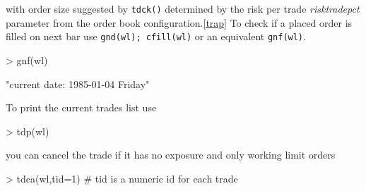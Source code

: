 \documentclass{article}
\begin{document}
with order size suggested by {\tt tdck()} determined by the risk per trade {\sl risktradepct} parameter
from the order book configuration.\ref{trap} 
To check if a placed order is filled on next bar use {\tt gnd(wl); cfill(wl)} or  an equivalent {\tt gnf(wl)}.
\begin{Schunk}
\begin{Sinput}
> gnf(wl)
\end{Sinput}
\begin{Soutput}
[1] "current date: 1985-01-04 Friday"
\end{Soutput}
\end{Schunk}
To print the current trades list use
\begin{Schunk}
\begin{Sinput}
> tdp(wl)
\end{Sinput}
\end{Schunk}
you can cancel the trade if it has no exposure and only working limit orders
\begin{Schunk}
\begin{Sinput}
> tdca(wl,tid=1) # tid is a numeric id for each trade
\end{Sinput}
\end{Schunk}
\end{document}
